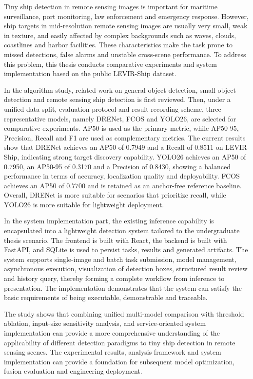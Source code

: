 \begin{abstract*}
  \noindent
  Tiny ship detection in remote sensing images is important for maritime surveillance, port monitoring, law enforcement and emergency response. However, ship targets in mid-resolution remote sensing images are usually very small, weak in texture, and easily affected by complex backgrounds such as waves, clouds, coastlines and harbor facilities. These characteristics make the task prone to missed detections, false alarms and unstable cross-scene performance. To address this problem, this thesis conducts comparative experiments and system implementation based on the public LEVIR-Ship dataset.

  In the algorithm study, related work on general object detection, small object detection and remote sensing ship detection is first reviewed. Then, under a unified data split, evaluation protocol and result recording scheme, three representative models, namely DRENet, FCOS and YOLO26, are selected for comparative experiments. AP50 is used as the primary metric, while AP50-95, Precision, Recall and F1 are used as complementary metrics. The current results show that DRENet achieves an AP50 of 0.7949 and a Recall of 0.8511 on LEVIR-Ship, indicating strong target discovery capability. YOLO26 achieves an AP50 of 0.7950, an AP50-95 of 0.3170 and a Precision of 0.8430, showing a balanced performance in terms of accuracy, localization quality and deployability. FCOS achieves an AP50 of 0.7700 and is retained as an anchor-free reference baseline. Overall, DRENet is more suitable for scenarios that prioritize recall, while YOLO26 is more suitable for lightweight deployment.

  In the system implementation part, the existing inference capability is encapsulated into a lightweight detection system tailored to the undergraduate thesis scenario. The frontend is built with React, the backend is built with FastAPI, and SQLite is used to persist tasks, results and generated artifacts. The system supports single-image and batch task submission, model management, asynchronous execution, visualization of detection boxes, structured result review and history query, thereby forming a complete workflow from inference to presentation. The implementation demonstrates that the system can satisfy the basic requirements of being executable, demonstrable and traceable.

  The study shows that combining unified multi-model comparison with threshold ablation, input-size sensitivity analysis, and service-oriented system implementation can provide a more comprehensive understanding of the applicability of different detection paradigms to tiny ship detection in remote sensing scenes. The experimental results, analysis framework and system implementation can provide a foundation for subsequent model optimization, fusion evaluation and engineering deployment.
\end{abstract*}
